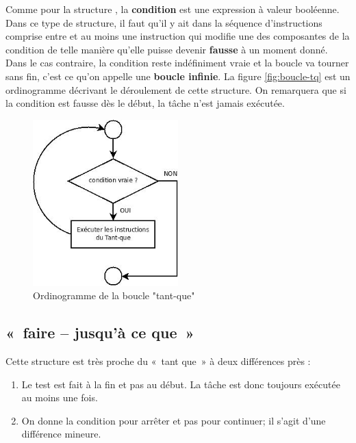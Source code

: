 		Comme pour la structure , la \textbf{condition} est
		une expression à valeur booléenne. Dans ce type de structure, il faut
		qu’il y ait dans la séquence d’instructions comprise entre
		 et  au moins une
		instruction qui modifie une des composantes de la condition de telle
		manière qu’elle puisse devenir \textbf{fausse} à un moment donné. Dans
		le cas contraire, la condition reste indéfiniment vraie et la boucle va
		tourner sans fin, c'est ce qu'on appelle une \textbf{boucle infinie}. 
		La figure \vref{fig:boucle-tq} est un ordinogramme 
		décrivant le déroulement de cette structure. 
		On remarquera que si la condition est fausse dès le début, 
		la tâche n'est jamais exécutée.

		\begin{figure}[h]
		\centering
		\includegraphics[width=0.5\textwidth]{image/boucle-tq}
		\caption{Ordinogramme de la boucle "tant-que"}
		\label{fig:boucle-tq}
		\end{figure}
		
	\subsection{«~faire – jusqu'à ce que~»}

		Cette structure est très proche du «~tant que~» 
		à deux différences près :
	
		\begin{enumerate}
		\item {
			Le test est fait à la fin et pas au début. La tâche est donc toujours
			exécutée au moins une fois. }
		\item {
			On donne la condition pour arrêter et pas pour continuer; il
			s'agit d'une différence mineure.}
		\end{enumerate}

